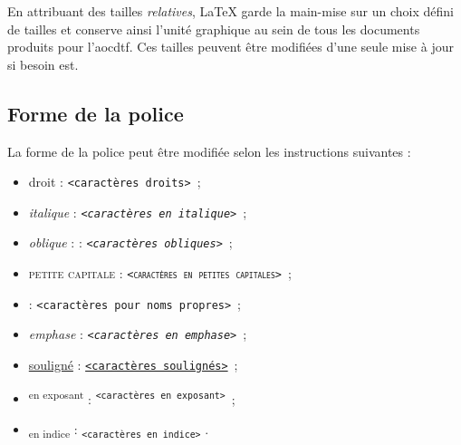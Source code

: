 \documentclass[a4paper, 11pt, twoside, fleqn]{memoir}
\begin{document}
		
En attribuant des tailles \emph{relatives}, \LaTeX{} garde la main-mise sur un choix défini de tailles et conserve ainsi l'unité graphique au sein de tous les documents produits pour l'\gls{aocdtf}.  Ces tailles peuvent être modifiées d'une seule mise à jour si besoin est.

	\subsection{Forme de la police}
	
	La forme de la police peut être modifiée selon les instructions suivantes :
		
		\begin{itemize}
	\item droit : \texttt{\textup{<caractères droits>}} \,;
	\item \textit{italique} : \texttt{\textit{<caractères en italique>}} \,;
	\item \textsl{oblique} : : \texttt{\textsl{<caractères obliques>}} \,;
	\item \textsc{petite capitale} : \texttt{\textsc{<caractères en petites capitales>}} \,;
	\item {} :  \texttt{\textmd{<caractères pour noms propres>}} \,;
	\item \emph{emphase} : \texttt{\emph{<caractères en emphase>}} \,;
	\item \underline{souligné} : \texttt{\underline{<caractères soulignés>}} \,;
	\item \textsuperscript{en exposant} : \texttt{\textsuperscript{<caractères en exposant>}} \,;
	\item \textsubscript{en indice} : \texttt{\textsubscript{<caractères en indice>}} .\\
		\end{itemize}	
		
\end{document}
